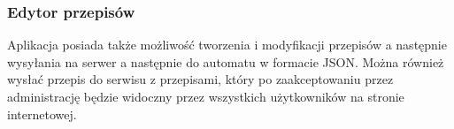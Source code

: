 \documentclass[12pt,a4paper,notitlepage]{report}
\begin{document}
\subsubsection{Edytor przepisów}
Aplikacja posiada także możliwość tworzenia i modyfikacji przepisów a następnie wysyłania na serwer a następnie do automatu w formacie JSON. Można również wysłać przepis do serwisu z przepisami, który po zaakceptowaniu przez administrację będzie widoczny przez wszystkich użytkowników na stronie internetowej.
\end{document}
